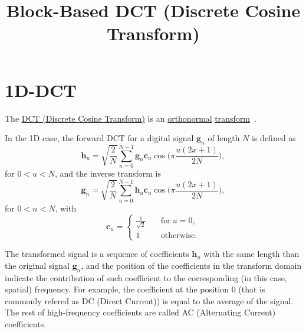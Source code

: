 
\title{Block-Based DCT (Discrete Cosine Transform)}

\maketitle

\tableofcontents

\section{1D-DCT}

The \href{https://en.wikipedia.org/wiki/Discrete_cosine_transform}{DCT
  (Discrete Cosine Transform)} is an
\href{https://en.wikipedia.org/wiki/Orthonormality}{orthonormal}
\href{https://vicente-gonzalez-ruiz.github.io/transform_coding/}{transform}~\cite{vruiz__transform_coding}.

In the 1D case, the forward DCT for a digital signal $\mathbf{g}_n$ of
length $N$ is defined as~\cite{burger2016digital}
\begin{equation}
  {\mathbf h}_u = \sqrt{\frac{2}{N}}\sum_{n=0}^{N-1}{\mathbf
    g}_n{\mathbf c}_u\cos\Big(\pi\frac{u(2x+1)}{2N}\Big),
\end{equation}
for $0<u<N$, and the inverse transform is
\begin{equation}
  {\mathbf g}_n = \sqrt{\frac{2}{N}}\sum_{u=0}^{N-1}{\mathbf
    h}_u{\mathbf c}_u\cos\Big(\pi\frac{u(2x+1)}{2N}\Big),
\end{equation}
for $0<n<N$, with
\begin{equation}
  {\mathbf c}_u = \left\{
  \begin{array}{ll}
    \frac{1}{\sqrt{2}} & \quad \text{for}~u=0, \\
    1 & \quad \text{otherwise}.
  \end{array}
  \right.
\end{equation}

The transformed signal is a sequence of coefficients ${\mathbf h}_u$
with the same length than the original signal ${\mathbf g}_n$, and the
position of the coefficients in the transform domain indicate the
contribution of such coefficient to the corresponding (in this case,
spatial) frequency. For example, the coefficient at the position 0
(that is commonly refered as DC (Direct Current)) is equal to the
average of the signal. The rest of high-frequency coefficients are
called AC (Alternating Current) coefficients.

